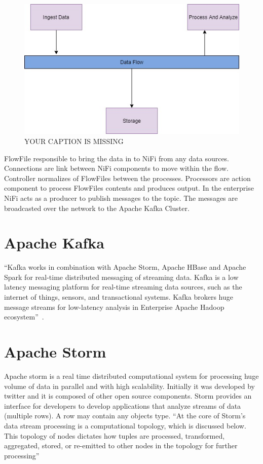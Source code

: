 \begin{figure}[!ht]
\centering\includegraphics[width=\columnwidth]{images/NiFi.jpg}
  \caption{YOUR CAPTION IS MISSING}\label{f:nifi}
\end{figure}
 

FlowFile responsible to bring the data in to NiFi from any data sources. 
Connections are link between NiFi components to move within the flow. 
Controller normalizes of FlowFiles between the processes.  Processors are 
action component to process FlowFiles contents and produces output. 
In the enterprise NiFi acts as a producer to publish messages to the topic. 
The messages are broadcasted over the network to the Apache Kafka Cluster.
 
 
\section{Apache Kafka}

``Kafka works in combination with Apache Storm, Apache HBase and
Apache Spark for real-time distributed messaging of streaming data.
Kafka is a low latency messaging platform for real-time streaming data
sources, such as the internet of things, sensors, and transactional
systems. Kafka brokers huge message streams for low-latency analysis
in Enterprise Apache Hadoop ecosystem''~\cite{hid-sp18-514-hwp}.
 
\section{Apache Storm}

Apache storm is a real time distributed computational system for
processing huge volume of data in parallel and with high
scalability. Initially it was developed by twitter and it is composed
of other open source components.  Storm provides an interface for
developers to develop applications that analyze streams of data
(multiple rows).  A row may contain any objects type.  ``At the core
of Storm's data stream processing is a computational topology, which
is discussed below.  This topology of nodes dictates how tuples are
processed, transformed, aggregated, stored, or re-emitted to other
nodes in the topology for further processing''~\cite{hid-sp18-514-hwp}

